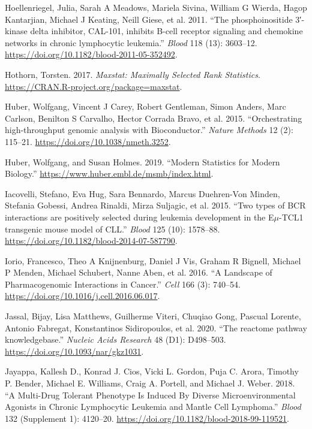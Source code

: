 \documentclass[11pt, a4paper, twosided]{book}
\newenvironment{CSLReferences}%
  {}%
  {\par}
\begin{document}
\begin{CSLReferences}{1}{0}
\leavevmode{}%
Hoellenriegel, Julia, Sarah A Meadows, Mariela Sivina, William G Wierda, Hagop Kantarjian, Michael J Keating, Neill Giese, et al. 2011. {``{The phosphoinositide 3′-kinase delta inhibitor, CAL-101, inhibits B-cell receptor signaling and chemokine networks in chronic lymphocytic leukemia}.''} \emph{Blood} 118 (13): 3603--12. \url{https://doi.org/10.1182/blood-2011-05-352492}.

\leavevmode{}%
Hothorn, Torsten. 2017. \emph{Maxstat: Maximally Selected Rank Statistics}. \url{https://CRAN.R-project.org/package=maxstat}.

\leavevmode{}%
Huber, Wolfgang, Vincent J Carey, Robert Gentleman, Simon Anders, Marc Carlson, Benilton S Carvalho, Hector Corrada Bravo, et al. 2015. {``{Orchestrating high-throughput genomic analysis with Bioconductor}.''} \emph{Nature Methods} 12 (2): 115--21. \url{https://doi.org/10.1038/nmeth.3252}.

\leavevmode{}%
Huber, Wolfgang, and Susan Holmes. 2019. {``{Modern Statistics for Modern Biology}.''} \url{https://www.huber.embl.de/msmb/index.html}.

\leavevmode{}%
Iacovelli, Stefano, Eva Hug, Sara Bennardo, Marcus Duehren-Von Minden, Stefania Gobessi, Andrea Rinaldi, Mirza Suljagic, et al. 2015. {``{Two types of BCR interactions are positively selected during leukemia development in the E\(\mu\)-TCL1 transgenic mouse model of CLL}.''} \emph{Blood} 125 (10): 1578--88. \url{https://doi.org/10.1182/blood-2014-07-587790}.

\leavevmode{}%
Iorio, Francesco, Theo A Knijnenburg, Daniel J Vis, Graham R Bignell, Michael P Menden, Michael Schubert, Nanne Aben, et al. 2016. {``{A Landscape of Pharmacogenomic Interactions in Cancer}.''} \emph{Cell} 166 (3): 740--54. \url{https://doi.org/10.1016/j.cell.2016.06.017}.

\leavevmode{}%
Jassal, Bijay, Lisa Matthews, Guilherme Viteri, Chuqiao Gong, Pascual Lorente, Antonio Fabregat, Konstantinos Sidiropoulos, et al. 2020. {``{The reactome pathway knowledgebase}.''} \emph{Nucleic Acids Research} 48 (D1): D498--503. \url{https://doi.org/10.1093/nar/gkz1031}.

\leavevmode{}%
Jayappa, Kallesh D., Konrad J. Cios, Vicki L. Gordon, Puja C. Arora, Timothy P. Bender, Michael E. Williams, Craig A. Portell, and Michael J. Weber. 2018. {``{A Multi-Drug Tolerant Phenotype Is Induced By Diverse Microenvironmental Agonists in Chronic Lymphocytic Leukemia and Mantle Cell Lymphoma}.''} \emph{Blood} 132 (Supplement 1): 4120--20. \url{https://doi.org/10.1182/blood-2018-99-119521}.


\end{CSLReferences}
\end{document}

